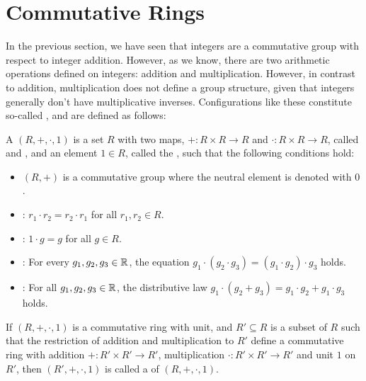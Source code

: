 \section{Commutative Rings}\label{sec:rings}
In the previous section, we have seen that integers are a commutative group with respect to integer addition. However, as we know, there are two arithmetic operations defined on integers: addition and multiplication. However, in contrast to addition, multiplication does not define a group structure, given that integers generally don't have multiplicative inverses. Configurations like these constitute so-called , and are defined as follows: 

\begin{definition}\label{def:comm-ring-unit}
A  $ (R, +, \cdot, 1) $ is a set $R$ with two maps, $ +: R \times R \to R $ and $ \cdot: R \times R \to R $, called  and , and an element $1\in R$, called the , such that the following conditions hold:
\begin{itemize}
\item $ (R, +) $ is a commutative group where the neutral element is denoted  with $ 0 $.
\item {}: $r_1\cdot r_2 = r_2\cdot r_1$ for all $r_1, r_2\in R$.
\item {}: $1\cdot g=g$ for all $g\in R$.
\item {}: For every $g_1,g_2,g_3\in\mathbb{R}$, the equation
$g_1\cdot(g_2\cdot g_3) = (g_1\cdot g_2)\cdot g_3$ holds.
\item {}: For all $ g_1, g_2, g_3 \in\mathbb{R} $, the distributive law
$ g_1 \cdot \left (g_2 + g_3 \right) = g_1 \cdot g_2 + g_1 \cdot g_3$ holds.
\end{itemize}
If $(R,+,\cdot,1)$ is a commutative ring with unit, and $R'\subseteq R$ is a subset of $R$ such that the restriction of addition and multiplication to $R'$ define a commutative ring with addition $+: R'\times R' \to R'$, multiplication $\cdot: R'\times R' \to R'$ and unit $1$ on $R'$, then $(R',+,\cdot,1)$ is called a  of $(R,+,\cdot,1)$.
\end{definition}
